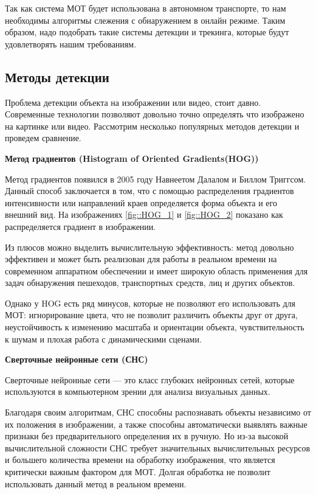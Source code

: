 Так как система МОТ будет использована в автономном транспорте, то нам необходимы алгоритмы слежения с обнаружением в онлайн режиме. Таким образом, надо подобрать такие системы детекции и трекинга, которые будут удовлетворять нашим требованиям.

\subsection{Методы детекции}

Проблема детекции объекта на изображении или видео, стоит давно. Современные технологии позволяют довольно точно определять что изображено на картинке или видео. Рассмотрим несколько популярных методов детекции и проведем сравнение.

\textbf{Метод градиентов (Histogram of Oriented Gradients(HOG))}

Метод градиентов появился в 2005 году Навнеетом Далалом и Биллом Триггсом. Данный способ заключается в том, что с помощью распределения градиентов интенсивности или направлений краев определяется форма объекта и его внешний вид. На изображениях \ref{fig::HOG_1} и \ref{fig::HOG_2} показано как распределяется градиент в изображении.


Из плюсов можно выделить вычислительную эффективность: метод довольно эффективен и может быть реализован для работы в реальном времени на современном аппаратном обеспечении и имеет широкую область применения для задач обнаружения пешеходов, транспортных средств, лиц и других объектов. 


Однако у HOG есть ряд минусов, которые не позволяют его использовать для МОТ: игнорирование цвета, что не позволит различить объекты друг от друга, неустойчивость к изменению масштаба и ориентации объекта, чувствительность к шумам и плохая работа с динамическими сценами.  

\textbf{Сверточные нейронные сети (СНС)}

Сверточные нейронные сети --- это класс глубоких нейронных сетей, которые используются в компьютерном зрении для анализа визуальных данных. 

Благодаря своим алгоритмам, СНС способны распознавать объекты независимо от их положения в изображении, а также способны автоматически выявлять важные признаки без предварительного определения их в ручную. Но из-за высокой вычислительной сложности СНС требует значительных вычислительных ресурсов и большего количества времени на обработку изображения, что является критически важным фактором для МОТ. Долгая обработка не позволит использовать данный метод в реальном времени.

